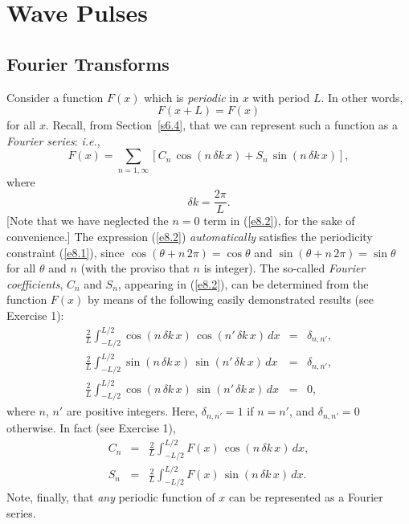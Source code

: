 \chapter{Wave Pulses}\label{c8}
\section{Fourier Transforms}\label{s8.1}
Consider a function $F(x)$ which is {\em periodic}\/ in $x$ with period $L$. In other
words,
\begin{equation}\label{e8.1}
F(x+L) = F(x)
\end{equation}
for all $x$. Recall, from Section~\ref{s6.4}, that we can
represent such a function as a {\em Fourier series}: {\em i.e.}, 
\begin{equation}\label{e8.2}
F(x)= \sum_{n=1,\infty} \left[C_n\,\cos(n\,\delta k\,x) + S_n\,\sin(n\,\delta k\,x)\right],
\end{equation}
where 
\begin{equation}
\delta k = \frac{2\pi}{L}.
\end{equation}
[Note that we have neglected the $n=0$ term in (\ref{e8.2}), for the sake of convenience.] 
The  expression (\ref{e8.2}) {\em automatically}\/ satisfies the periodicity constraint (\ref{e8.1}), since $\cos(\theta+n\,2\pi)=\cos\theta$ and $\sin(\theta+n\,2\pi)=\sin\theta$
for all $\theta$ and $n$ (with the proviso that $n$ is integer). 
The so-called {\em Fourier coefficients},  $C_n$ and $S_n$, appearing in (\ref{e8.2}), can
be determined from the function $F(x)$ by means  of the following easily demonstrated
results (see Exercise 1):
\begin{eqnarray}\label{e8.4}
\frac{2}{L}\int_{-L/2}^{L/2}\cos(n\,\delta k\,x)\,\cos(n'\,\delta k \,x)\,dx &=&\delta_{n,n'},\\[0.5ex]
\frac{2}{L}\int_{-L/2}^{L/2}\sin(n\,\delta k\,x)\,\sin(n'\,\delta k \,x)\,dx &=&\delta_{n,n'},\\[0.5ex]
\frac{2}{L}\int_{-L/2}^{L/2}\cos(n\,\delta k\,x)\,\sin(n'\,\delta k \,x)\,dx &=&0,\label{e8.6}
\end{eqnarray}
where $n$, $n'$ are positive integers. Here, $\delta_{n,n'}=1$ if $n=n'$, and
$\delta_{n,n'}=0$ otherwise. 
In fact (see Exercise 1),
\begin{eqnarray}\label{e8.7}
C_n &=&\frac{2}{L}\int_{-L/2}^{L/2} F(x)\,\cos(n\,\delta k\,x)\,dx,\\[0.5ex]
S_n &=&\frac{2}{L}\int_{-L/2}^{L/2} F(x)\,\sin(n\,\delta k\,x)\,dx.\label{e8.8}
\end{eqnarray}
Note, finally, that {\em any}\/ periodic function of $x$ can be represented as a
Fourier series. 

